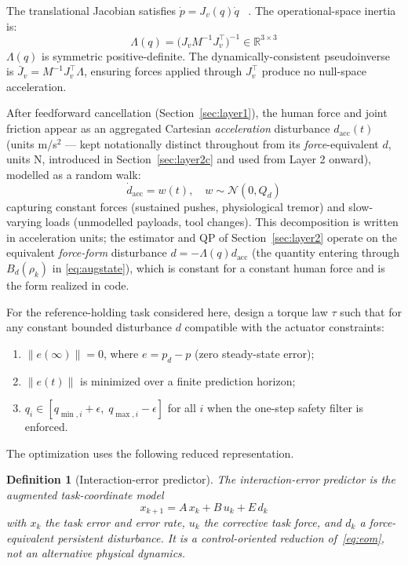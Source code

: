 \documentclass[journal]{IEEEtran}
\newtheorem{definition}{Definition}
\newcommand{\Jvb}{\bar{J}_v}
\begin{document}
The translational Jacobian satisfies $\dot{p}=J_v(q)\dot{q}$~%
\cite{siciliano2009robotics}.
The operational-space inertia~\cite{khatib1987unified} is:
\begin{equation}\label{eq:Lambda}
  \Lambda(q)=\bigl(J_vM^{-1}J_v^\top\bigr)^{-1}\in\mathbb{R}^{3\times3}
\end{equation}
$\Lambda(q)$ is symmetric positive-definite.
The dynamically-consistent
pseudoinverse~\cite{khatib1987unified,sentis2005synthesis} is
$\Jvb=M^{-1}J_v^\top\Lambda$, ensuring forces applied through
$J_v^\top$ produce no null-space acceleration.

After feedforward cancellation (Section~\ref{sec:layer1}), the human
force and joint friction appear as an aggregated Cartesian
\emph{acceleration} disturbance $d_{\text{acc}}(t)$ (units m/s$^2$ ---
kept notationally distinct throughout from its \emph{force}-equivalent
$d$, units N, introduced in Section~\ref{sec:layer2c} and used from Layer
2 onward), modelled as a random walk:
\begin{equation}\label{eq:distmodel}
  \dot{d}_{\text{acc}}=w(t),\quad w\sim\mathcal{N}(0,Q_d)
\end{equation}
capturing constant forces (sustained pushes, physiological tremor) and
slow-varying loads (unmodelled payloads, tool changes).
This decomposition is written in acceleration units; the estimator and QP of
Section~\ref{sec:layer2} operate on the equivalent \emph{force-form}
disturbance $d=-\Lambda(q)d_{\mathrm{acc}}$ (the quantity entering through $B_d(\rho_k)$ in
\eqref{eq:augstate}), which is constant for a constant human force and is the
form realized in code.

For the reference-holding task considered here, design a torque law $\tau$
such that for any constant bounded disturbance $d$ compatible with the
actuator constraints:
\begin{enumerate}
  \item $\|e(\infty)\|=0$, where $e=p_d-p$ (zero steady-state error);
  \item $\|e(t)\|$ is minimized over a finite prediction horizon;
  \item $q_i\in[q_{\min,i}+\epsilon,\;q_{\max,i}-\epsilon]$
        for all $i$ when the one-step safety filter is enforced.
\end{enumerate}

The optimization uses the following reduced representation.
\begin{definition}[Interaction-error predictor]\label{def:id}
The \emph{interaction-error predictor} is the augmented task-coordinate model
\[
  x_{k+1} = A\,x_k + B\,u_k + E\,d_k
\]
with $x_k$ the task error and error rate, $u_k$ the corrective task force, and
$d_k$ a force-equivalent persistent disturbance. It is a control-oriented
reduction of~\eqref{eq:eom}, not an alternative physical dynamics.
\end{definition}
\end{document}
